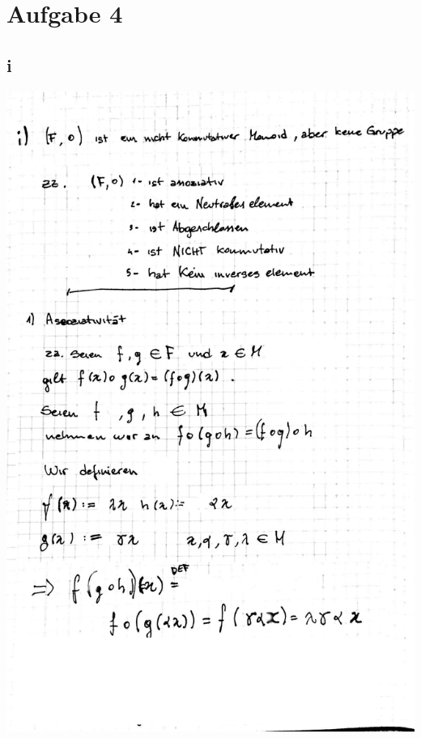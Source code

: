 \documentclass[10pt,a4paper]{article}
\begin{document}
\newpage
\section{Aufgabe 4}
\subsection{i}
\includegraphics[width=\textwidth]{lat5b_1.jpg}
\end{document}
